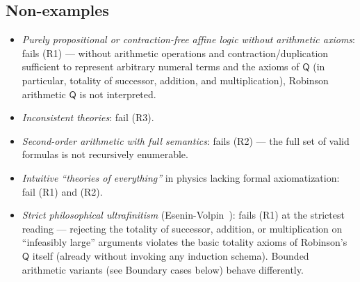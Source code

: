 \documentclass[11pt]{article}
\theoremstyle{plain}
\theoremstyle{definition}
\begin{document}
\subsection{Non-examples}

\begin{itemize}
\item \emph{Purely propositional or contraction-free affine logic without arithmetic axioms}: fails (R1) --- without arithmetic operations and contraction/duplication sufficient to represent arbitrary numeral terms and the axioms of $\mathsf{Q}$ (in particular, totality of successor, addition, and multiplication), Robinson arithmetic $\mathsf{Q}$ is not interpreted.
\item \emph{Inconsistent theories}: fail (R3).
\item \emph{Second-order arithmetic with full semantics}: fails (R2) --- the full set of valid formulas is not recursively enumerable.
\item \emph{Intuitive ``theories of everything''} in physics lacking formal axiomatization: fail (R1) and (R2).
\item \emph{Strict philosophical ultrafinitism} (Esenin-Volpin~\cite{EseninVolpin1961,EseninVolpin1970}): fails (R1) at the strictest reading --- rejecting the totality of successor, addition, or multiplication on ``infeasibly large'' arguments violates the basic totality axioms of Robinson's $\mathsf{Q}$ itself (already without invoking any induction schema). Bounded arithmetic variants (see Boundary cases below) behave differently.
\end{itemize}
\end{document}

